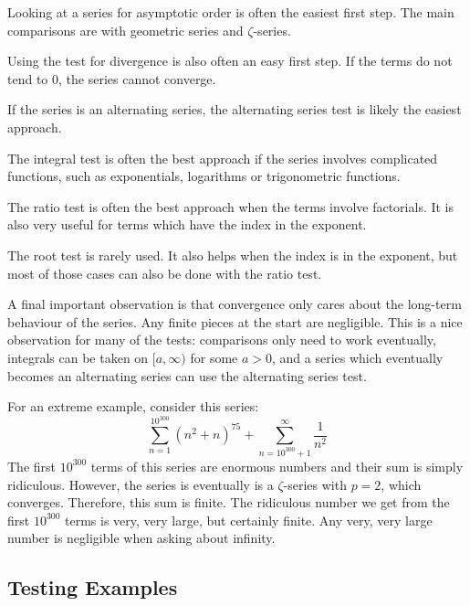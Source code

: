 \documentclass[fleqn,letterpaper]{report}
\begin{document}
\begin{smallitemize}
\item Looking at a series for asymptotic order is often the
easiest first step. The main comparisons are with geometric
series and $\zeta$-series. 
\item Using the test for divergence is also often an easy
first step. If the terms do not tend to $0$, the series
cannot converge.
\item If the series is an alternating series, the alternating
series test is likely the easiest approach.
\item The integral test is often the best approach if the
series involves complicated functions, such as exponentials,
logarithms or trigonometric functions.
\item The ratio test is often the best approach when the terms
involve factorials. It is also very useful for terms which
have the index in the exponent. 
\item The root test is rarely used. It also helps when the
index is in the exponent, but most of those cases can also be
done with the ratio test. 
\end{smallitemize}
A final important observation is that convergence only cares
about the long-term behaviour of the series. Any finite
pieces at the start are negligible. This is a nice
observation for many of the tests: comparisons only need to
work eventually, integrals can be taken on $[a,\infty)$ for
some $a>0$, and a series which eventually becomes an
alternating series can use the alternating series test. 

\begin{example}
For an extreme example, consider this series:
\begin{equation*}
\sum_{n=1}^{10^{300}} (n^2 +n)^{75} + \sum_{n=10^{300} + 1}^\infty
\frac{1}{n^2} 
\end{equation*}
The first $10^{300}$ terms of this series are enormous numbers
and their sum is simply ridiculous. However, the series is
eventually is a $\zeta$-series with $p=2$, which converges.
Therefore, this sum is finite. The ridiculous number we get
from the first $10^{300}$ terms is very, very large, but
certainly finite. Any very, very large number is negligible
when asking about infinity. 
\end{example}

\subsection{Testing Examples}
\label{testing-examples}
\end{document}

